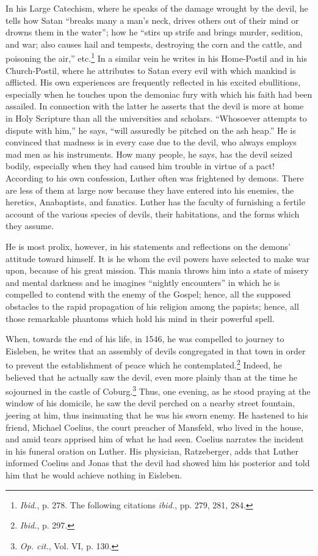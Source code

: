 In his Large Catechism, where he speaks of the damage wrought by the
devil, he tells how Satan “breaks many a man’s neck, drives others out of
their mind or drowns them in the water”; how he “stirs up strife and brings
murder, sedition, and war; also causes hail and tempests, destroying the
corn and the cattle, and poisoning the air,” etc.\footnote{\textit{Ibid.}, p. 278. The following citations \textit{ibid.}, pp. 279, 281, 284.}
 In a similar vein he writes
in his Home-Postil and in his Church-Postil, where he attributes to Satan
every evil with which mankind is afflicted. His own experiences are frequently
reflected in his excited ebullitions, especially when he touches upon
the demoniac fury with which his faith had been assailed. In connection
with the latter he asserts that the devil is more at home in Holy Scripture
than all the universities and scholars. “Whosoever attempts to dispute with
him,” he says, “will assuredly be pitched on the ash heap.” He is convinced
that madness is in every case due to the devil, who always employs mad men
as his instruments. How many people, he says, has the devil seized bodily,
especially when they had caused him trouble in virtue of a pact! According
to his own confession, Luther often was frightened by demons. There are
less of them at large now because they have entered into his enemies, the
heretics, Anabaptists, and fanatics. Luther has the faculty of furnishing
a fertile account of the various species of devils, their habitations, and
the forms which they assume.

He is most prolix, however, in his statements and reflections on the
demons’ attitude toward himself. It is he whom the evil powers have
selected to make war upon, because of his great mission. This mania
throws him into a state of misery and mental darkness and he imagines
“nightly encounters” in which he is compelled to contend with
the enemy of the Gospel; hence, all the supposed obstacles to the rapid
propagation of his religion among the papists; hence, all those remarkable
phantoms which hold his mind in their powerful spell.

When, towards the end of his life, in 1546, he was compelled to
journey to Eisleben, he writes that an assembly of devils congregated
in that town in order to prevent the establishment of peace which
he contemplated.\footnote{\textit{Ibid.}, p. 297.}
 Indeed, he believed that he actually saw the devil,
even more plainly than at the time he sojourned in the castle of
Coburg.\footnote{\textit{Op. cit.}, Vol. VI, p. 130.}
 Thus, one evening, as he stood praying at the window of
his domicile, he saw the devil perched on a nearby street fountain,
jeering at him, thus insinuating that he was his sworn enemy. He
hastened to his friend, Michael Coelius, the court preacher of Mansfeld,
who lived in the house, and amid tears apprised him of what he
had seen. Coelius narrates the incident in his funeral oration on
Luther. His physician, Ratzeberger, adds that Luther informed Coelius
and Jonas that the devil had showed him his posterior and told him
that he would achieve nothing in Eisleben.

